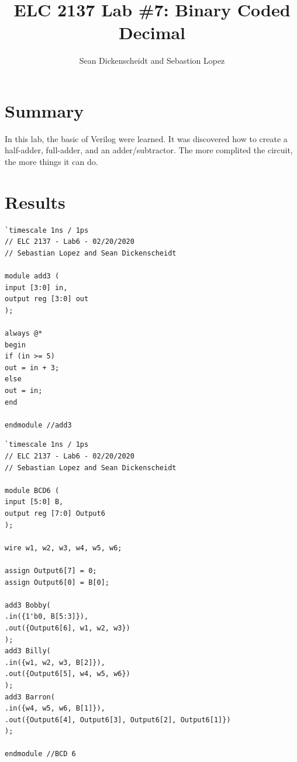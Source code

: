 \documentclass[11pt]{article}
\begin{document}
\title{ELC 2137 Lab \#7: Binary Coded Decimal}
\author{Sean Dickenscheidt and Sebastion Lopez}

\maketitle


\section*{Summary}

In this lab, the basic of Verilog were learned. It was discovered how to create a half-adder, full-adder, and 
an adder/subtractor. The more complited the circuit, the more things it can do.


\section*{Results}


\begin{lstlisting}[style=Verilog,
caption=Add3 code,
label=code:ex 
]
`timescale 1ns / 1ps
// ELC 2137 - Lab6 - 02/20/2020
// Sebastian Lopez and Sean Dickenscheidt 

module add3 (
input [3:0] in, 
output reg [3:0] out
);

always @* 
begin
if (in >= 5)
out = in + 3; 
else
out = in;
end  

endmodule //add3
\end{lstlisting}

\begin{lstlisting}[style=Verilog,
caption=BCD6 code,
label=code:ex 
]
`timescale 1ns / 1ps
// ELC 2137 - Lab6 - 02/20/2020
// Sebastian Lopez and Sean Dickenscheidt 

module BCD6 (
input [5:0] B, 
output reg [7:0] Output6
);

wire w1, w2, w3, w4, w5, w6;

assign Output6[7] = 0; 
assign Output6[0] = B[0];

add3 Bobby(
.in({1'b0, B[5:3]}), 
.out({Output6[6], w1, w2, w3}) 
);
add3 Billy(
.in({w1, w2, w3, B[2]}), 
.out({Output6[5], w4, w5, w6})
);
add3 Barron(
.in({w4, w5, w6, B[1]}),
.out({Output6[4], Output6[3], Output6[2], Output6[1]})
);

endmodule //BCD 6


\end{lstlisting}
\end{document}
